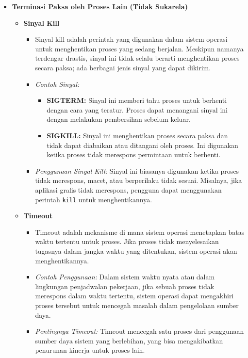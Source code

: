 \documentclass[12pt]{article}
\begin{document}
\begin{itemize}
\begin{itemize}
    \end{itemize}
    \begin{itemize}
    \item \textbf{Terminasi Paksa oleh Proses Lain (Tidak Sukarela)}
    \begin{itemize}
        \item \textbf{Sinyal Kill}
        \begin{itemize}
            \item Sinyal kill adalah perintah yang digunakan dalam sistem operasi untuk menghentikan proses yang sedang berjalan. Meskipun namanya terdengar drastis, sinyal ini tidak selalu berarti menghentikan proses secara paksa; ada berbagai jenis sinyal yang dapat dikirim.
            \item \textit{Contoh Sinyal:}
            \begin{itemize}
                \item \textbf{SIGTERM:} Sinyal ini memberi tahu proses untuk berhenti dengan cara yang teratur. Proses dapat menangani sinyal ini dengan melakukan pembersihan sebelum keluar.
                \item \textbf{SIGKILL:} Sinyal ini menghentikan proses secara paksa dan tidak dapat diabaikan atau ditangani oleh proses. Ini digunakan ketika proses tidak merespons permintaan untuk berhenti.
            \end{itemize}
            \item \textit{Penggunaan Sinyal Kill:}  
            Sinyal ini biasanya digunakan ketika proses tidak merespons, macet, atau berperilaku tidak sesuai. Misalnya, jika aplikasi grafis tidak merespons, pengguna dapat menggunakan perintah \texttt{kill} untuk menghentikannya.
        \end{itemize}
        \item \textbf{Timeout}
        \begin{itemize}
            \item Timeout adalah mekanisme di mana sistem operasi menetapkan batas waktu tertentu untuk proses. Jika proses tidak menyelesaikan tugasnya dalam jangka waktu yang ditentukan, sistem operasi akan menghentikannya.
            \item \textit{Contoh Penggunaan:}  
            Dalam sistem waktu nyata atau dalam lingkungan penjadwalan pekerjaan, jika sebuah proses tidak merespons dalam waktu tertentu, sistem operasi dapat mengakhiri proses tersebut untuk mencegah masalah dalam pengelolaan sumber daya.
            \item \textit{Pentingnya Timeout:}  
            Timeout mencegah satu proses dari penggunaan sumber daya sistem yang berlebihan, yang bisa mengakibatkan penurunan kinerja untuk proses lain.
        \end{itemize}
    \end{itemize}


\end{itemize}
\end{itemize}
\end{document}
